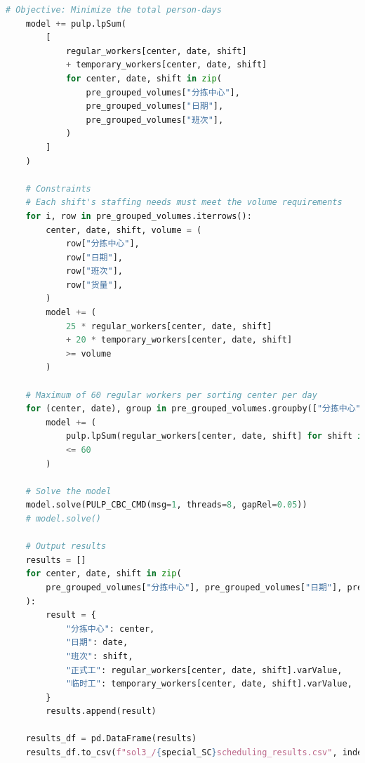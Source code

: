 \documentclass[UTF8]{article}%
\begin{document}
\begin{lstlisting}[language=python]
    # Objective: Minimize the total person-days
    model += pulp.lpSum(
        [
            regular_workers[center, date, shift]
            + temporary_workers[center, date, shift]
            for center, date, shift in zip(
                pre_grouped_volumes["分拣中心"],
                pre_grouped_volumes["日期"],
                pre_grouped_volumes["班次"],
            )
        ]
    )

    # Constraints
    # Each shift's staffing needs must meet the volume requirements
    for i, row in pre_grouped_volumes.iterrows():
        center, date, shift, volume = (
            row["分拣中心"],
            row["日期"],
            row["班次"],
            row["货量"],
        )
        model += (
            25 * regular_workers[center, date, shift]
            + 20 * temporary_workers[center, date, shift]
            >= volume
        )

    # Maximum of 60 regular workers per sorting center per day
    for (center, date), group in pre_grouped_volumes.groupby(["分拣中心", "日期"]):
        model += (
            pulp.lpSum(regular_workers[center, date, shift] for shift in group["班次"])
            <= 60
        )

    # Solve the model
    model.solve(PULP_CBC_CMD(msg=1, threads=8, gapRel=0.05))
    # model.solve()

    # Output results
    results = []
    for center, date, shift in zip(
        pre_grouped_volumes["分拣中心"], pre_grouped_volumes["日期"], pre_grouped_volumes["班次"]
    ):
        result = {
            "分拣中心": center,
            "日期": date,
            "班次": shift,
            "正式工": regular_workers[center, date, shift].varValue,
            "临时工": temporary_workers[center, date, shift].varValue,
        }
        results.append(result)

    results_df = pd.DataFrame(results)
    results_df.to_csv(f"sol3_/{special_SC}scheduling_results.csv", index=False)
\end{lstlisting}
\end{document}
